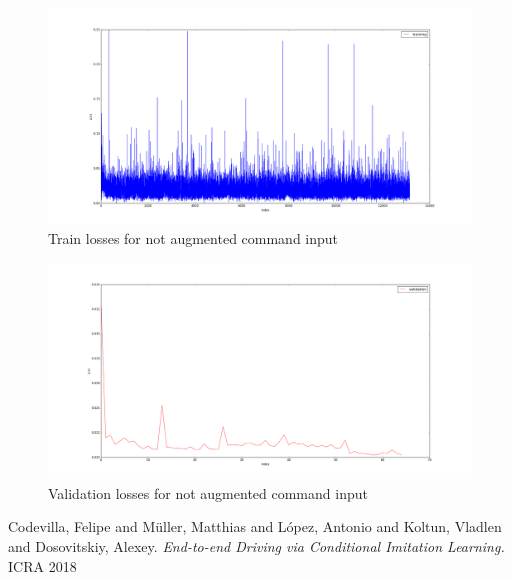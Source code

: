 \documentclass[a4paper]{article}
\begin{document}
\begin{minipage}{0.45\textwidth}
  \begin{figure}[H]
    \centering
    \includegraphics[width=\textwidth]{../pics/command_input_nonaugmented_training.png}
    \caption{Train losses for not augmented command input}
    \label{fig:non_augmented_train_loss}
  \end{figure}

\end{minipage}
\begin{minipage}{0.45\textwidth}
  \begin{figure}[H]
    \centering
    \includegraphics[width=\textwidth]{../pics/command_input_nonaugmented_validation.png}
    \caption{Validation losses for not augmented command input}
    \label{fig:non_augmented_val_loss}
  \end{figure}

\end{minipage}

\begin{thebibliography}{9}
Codevilla, Felipe and Müller, Matthias and López, Antonio and Koltun, Vladlen
and Dosovitskiy, Alexey.
\textit{End-to-end Driving via Conditional Imitation Learning.}
ICRA 2018
\end{thebibliography}
\end{document}
